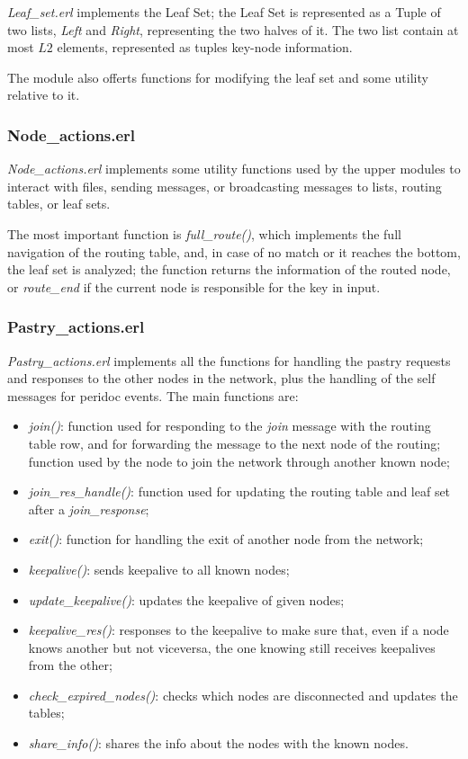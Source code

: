 \documentclass{article}
\begin{document}
\textit{Leaf\_set.erl} implements the Leaf Set; the Leaf Set is represented as a Tuple of two lists, 
\textit{Left} and \textit{Right}, representing the two halves of it. The two list contain at most $L2$ elements, 
represented as tuples key-node information.


The module also offerts functions for modifying the leaf set and some utility relative to it.


\subsubsection{Node\_actions.erl}

\textit{Node\_actions.erl} implements some utility functions used by the upper modules to interact with files, 
sending messages, or broadcasting messages to lists, routing tables, or leaf sets.

The most important function is \textit{full\_route()}, which implements the full navigation of the routing table, 
and, in case of no match or it reaches the bottom, the leaf set is analyzed; the function returns the information
 of the routed node, or \textit{route\_end} if the current node is responsible for the key in input.


\subsubsection{Pastry\_actions.erl}

\textit{Pastry\_actions.erl} implements all the functions for handling the pastry requests and responses
to the other nodes in the network, plus the handling of the self messages for peridoc events.
The main functions are:

\begin{itemize}
    \item \textit{join()}: function used for responding to the \textit{join} message with the routing table row, 
    and for forwarding the message to the next node of the routing; function used by the node to join the network through another known node;
    \item \textit{join\_res\_handle()}: function used for updating the routing table and leaf set after a \textit{join\_response};
    \item \textit{exit()}: function for handling the exit of another node from the network;
    \item \textit{keepalive()}: sends keepalive to all known nodes;
    \item \textit{update\_keepalive()}: updates the keepalive of given nodes;
    \item \textit{keepalive\_res()}: responses to the keepalive to make sure that, even if a node knows another but not viceversa, 
    the one knowing still receives keepalives from the other;
    \item \textit{check\_expired\_nodes()}: checks which nodes are disconnected and updates the tables;
    \item \textit{share\_info()}: shares the info about the nodes with the known nodes.
\end{itemize}
\end{document}
